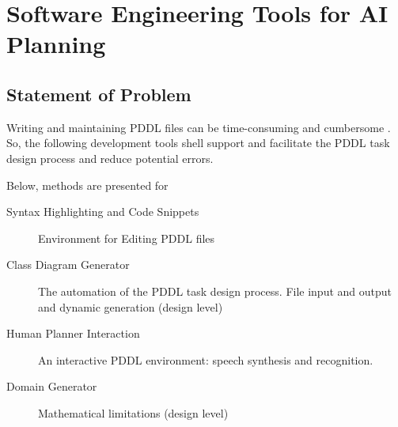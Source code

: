 \documentclass[11pt]{article}
\begin{document}
\section{Software Engineering Tools for AI Planning}
\label{sec-4}
\begin{center}
\end{center}

\subsection{Statement of Problem}
\label{sec-4-1}
Writing and maintaining PDDL files can be time-consuming and
cumbersome \textcite{li2012translating}. So, the following development
tools shell support and facilitate the PDDL task design process and
reduce potential errors.

Below, methods are presented for

\begin{description}
\item[{Syntax Highlighting and Code Snippets}] Environment for Editing
PDDL files
\item[{Class Diagram Generator}] The automation of the PDDL task design process. File
input and output and dynamic generation (design level)
\item[{Human Planner Interaction}] An interactive PDDL environment: speech synthesis and
recognition.
\item[{Domain Generator}] Mathematical limitations (design level)
\end{description}
\end{document}
